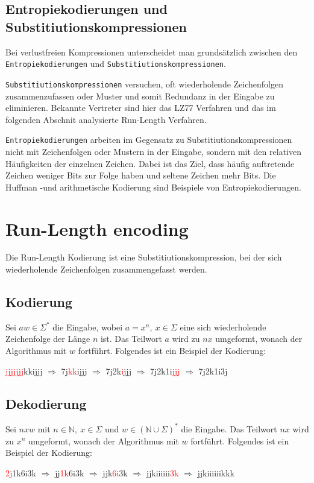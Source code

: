 \documentclass{article}
\newcommand{\R}{\Rightarrow}
\newcommand{\bb}[1]{\mathbb{{#1}}}
\newcommand{\red}{\textcolor{red}}
\newcommand{\para}{\par\null\par}
\begin{document}
\subsection{Entropiekodierungen und Substitiutionskompressionen}
Bei verlustfreien Kompressionen unterscheidet man grundsätzlich zwischen den
\texttt{Entropiekodierungen} und \texttt{Substitiutionskompressionen}.
\para
\texttt{Substitiutionskompressionen} versuchen, oft wiederholende Zeichenfolgen 
zusammenzufassen oder Muster und somit Redundanz in der Eingabe zu eliminieren. Bekannte Vertreter
sind hier das LZ77 Verfahren und das im folgenden Abschnit analysierte Run-Length Verfahren.
\para
\texttt{Entropiekodierungen} arbeiten im Gegensatz zu Substitiutionskompressionen nicht 
mit Zeichenfolgen oder Mustern in der Eingabe, sondern mit den relativen Häufigkeiten
der einzelnen Zeichen. Dabei ist das Ziel, dass häufig auftretende Zeichen weniger
Bits zur Folge haben und seltene Zeichen mehr Bits.
Die Huffman -und arithmetische Kodierung sind Beispiele von Entropiekodierungen.
\section{Run-Length encoding} 
Die Run-Length Kodierung ist eine Substitiutionskompression, bei der sich wiederholende
Zeichenfolgen zusammengefasst werden.
\subsection{Kodierung}
Sei $aw \in \Sigma^*$ die Eingabe, wobei $a = x^n,~x\in \Sigma$ eine
sich wiederholende Zeichenfolge der Länge $n$ ist. Das Teilwort $a$ wird zu $nx$ umgeformt, 
wonach der Algorithmus mit $w$ fortführt. Folgendes ist ein Beispiel der Kodierung:
\begin{center}
    \red{jjjjjjj}kkijjj $\R$ 7j\red{kk}ijjj $\R$ 7j2k\red{i}jjj $\R$ 7j2k1i\red{jjj} $\R$ 7j2k1i3j
\end{center}
\subsection{Dekodierung}
Sei $nxw$ mit $n\in \bb{N},~x\in\Sigma$ und $w\in(\bb{N}\cup\Sigma)^*$ die Eingabe. Das Teilwort $nx$ wird
zu $x^n$ umgeformt, wonach der Algorithmus mit $w$ fortführt. Folgendes ist ein Beispiel der Kodierung:
\begin{center}
    \red{2j}1k6i3k $\R$ jj\red{1k}6i3k $\R$ jjk\red{6i}3k $\R$ jjkiiiiii\red{3k} $\R$ jjkiiiiiikkk
\end{center}
\end{document}
